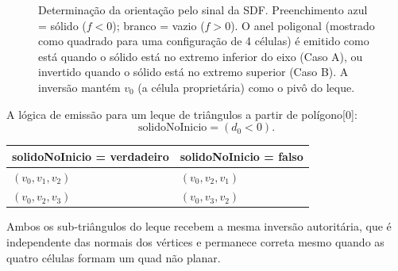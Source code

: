\documentclass[10pt,a4paper]{article}
\begin{document}
\begin{figure}[htb]
\caption{Determinação da orientação pelo sinal da SDF. Preenchimento
azul = sólido ($f<0$); branco = vazio ($f>0$). O anel poligonal
(mostrado como quadrado para uma configuração de 4 células) é emitido
como está quando o sólido está no extremo inferior do eixo (Caso A),
ou invertido quando o sólido está no extremo superior (Caso B).
A inversão mantém $v_0$ (a célula proprietária) como o pivô do leque.}
\label{fig:winding}
\end{figure}

A lógica de emissão para um leque de triângulos a partir de
polígono[0]:
\[
  \text{solidoNoInicio} = (d_0 < 0).
\]
\begin{center}
\begin{tabular}{ll}
  \toprule
  \multicolumn{1}{c}{solidoNoInicio = verdadeiro} &
  \multicolumn{1}{c}{solidoNoInicio = falso}\\
  \midrule
  $(v_0, v_1, v_2)$ & $(v_0, v_2, v_1)$ \\
  $(v_0, v_2, v_3)$ & $(v_0, v_3, v_2)$ \\
  \bottomrule
\end{tabular}
\end{center}
Ambos os sub-triângulos do leque recebem a mesma inversão
autoritária, que é independente das normais dos vértices e permanece
correta mesmo quando as quatro células formam um quad não planar.
\end{document}
